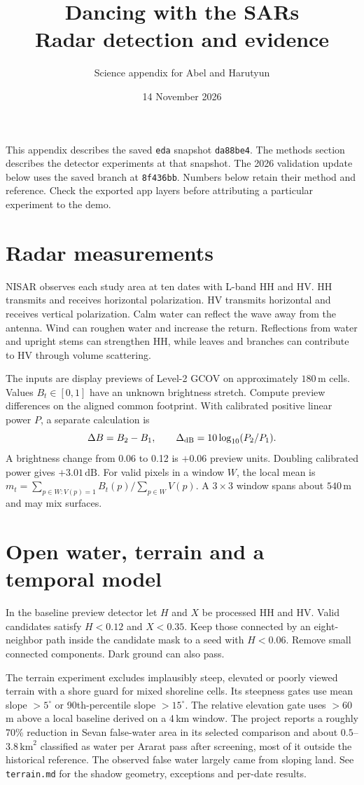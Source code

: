 \documentclass[11pt]{article}
\title{Dancing with the SARs\\Radar detection and evidence}
\author{Science appendix for Abel and Harutyun}
\date{14 November 2026}
\begin{document}
\maketitle
\noindent This appendix describes the saved \texttt{eda} snapshot
\texttt{da88be4}. The methods section describes the detector experiments at that snapshot.
The 2026 validation update below uses the saved branch at \texttt{8f436bb}.
Numbers below retain their method and reference. Check the exported app
layers before attributing a particular experiment to the demo.

\section{Radar measurements}
NISAR observes each study area at ten dates with L-band HH and HV.
HH transmits and receives horizontal polarization. HV transmits
horizontal and receives vertical polarization. Calm water can reflect
the wave away from the antenna. Wind can roughen water and increase
the return. Reflections from water and upright stems can strengthen
HH, while leaves and branches can contribute to HV through volume scattering.

The inputs are display previews of Level-2 GCOV on approximately
$180\,\mathrm{m}$ cells. Values $B_t\in[0,1]$ have an unknown brightness
stretch. Compute preview differences on the aligned common footprint.
With calibrated positive linear power $P$, a separate calculation is
\[
  \Delta B=B_2-B_1,\qquad \Delta_{\rm dB}=10\log_{10}(P_2/P_1).
\]
A brightness change from 0.06 to 0.12 is $+0.06$ preview units.
Doubling calibrated power gives $+3.01\,\mathrm{dB}$.
For valid pixels in a window $W$, the local mean is
$m_t=\sum_{p\in W:V(p)=1}B_t(p)/\sum_{p\in W}V(p)$.
A $3\times3$ window spans about $540\,\mathrm{m}$ and may mix surfaces.

\section{Open water, terrain and a temporal model}
In the baseline preview detector let $H$ and $X$ be processed HH and HV.
Valid candidates satisfy $H<0.12$ and $X<0.35$. Keep those connected
by an eight-neighbor path inside the candidate mask to a seed with
$H<0.06$. Remove small connected components. Dark ground can also pass.

The terrain experiment excludes implausibly steep, elevated or
poorly viewed terrain with a shore guard for mixed shoreline cells.
Its steepness gates use mean slope $>5^\circ$ or 90th-percentile
slope $>15^\circ$. The relative elevation gate uses $>60$\,m above
a local baseline derived on a 4\,km window. The project reports a
roughly 70\% reduction in Sevan false-water area in its selected comparison and about
$0.5$--$3.8\,\mathrm{km}^2$ classified as water per Ararat pass after
screening, most of it outside the historical reference. The observed
false water largely came from sloping land. See \texttt{terrain.md}
for the shadow geometry, exceptions and per-date results.
\end{document}
